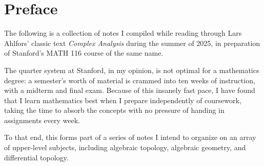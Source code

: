 \chapter*{Preface}
The following is a collection of notes I compiled while reading through Lars Ahlfors' classic text \textit{Complex Analysis} during the summer of 2025, in preparation of Stanford's MATH 116 course of the same name.

The quarter system at Stanford, in my opinion, is not optimal for a mathematics degree: a semester's worth of material is crammed into ten weeks of instruction, with a midterm and final exam. Because of this insanely fast pace, I have found that I learn mathematics best when I prepare independently of coursework, taking the time to absorb the concepts with no pressure of handing in assignments every week.

To that end, this forms part of a series of notes I intend to organize on an array of upper-level subjects, including algebraic topology, algebraic geometry, and differential topology.